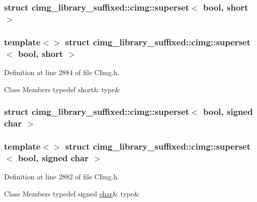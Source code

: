 \subsubsection{struct cimg\+\_\+library\+\_\+suffixed\+:\+:cimg\+:\+:superset$<$ bool, short $>$}
\subsubsection*{template$<$$>$\newline
struct cimg\+\_\+library\+\_\+suffixed\+::cimg\+::superset$<$ bool, short $>$}



Definition at line 2884 of file C\+Img.\+h.

\begin{DoxyFields}{Class Members}
\mbox{\label{namespacecimg__library__suffixed_1_1cimg_ad10e5178f0b07ea71386f97bb41043bf}} 
typedef short&
type&
\\
\hline

\end{DoxyFields}
\label{structcimg__library__suffixed_1_1cimg_1_1superset_3_01bool_00_01signed_01char_01_4}
\subsubsection{struct cimg\+\_\+library\+\_\+suffixed\+:\+:cimg\+:\+:superset$<$ bool, signed char $>$}
\subsubsection*{template$<$$>$\newline
struct cimg\+\_\+library\+\_\+suffixed\+::cimg\+::superset$<$ bool, signed char $>$}



Definition at line 2882 of file C\+Img.\+h.

\begin{DoxyFields}{Class Members}
\mbox{\label{namespacecimg__library__suffixed_1_1cimg_a1092e516767772f3376345fddaa5eed4}} 
typedef signed \hyperlink{classchar}{char}&
type&
\\
\hline

\end{DoxyFields}
\label{structcimg__library__suffixed_1_1cimg_1_1superset_3_01bool_00_01unsigned_01char_01_4}
